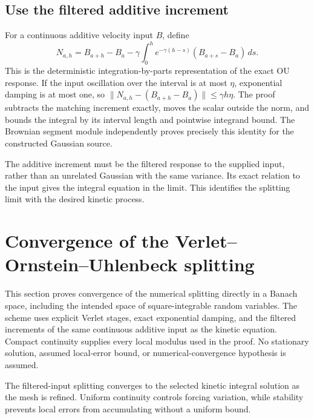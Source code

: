 \documentclass[11pt,a4paper]{report}
\begin{document}
\subsection{\texorpdfstring{Use the filtered additive increment}{Use the filtered additive increment}}
\label{report-step-KineticLangevin-KineticSplitting-lean-6}


For a continuous additive velocity input \(B\), define \[N_{a,h}=B_{a+h}-B_a-\gamma\int_0^h e^{-\gamma(h-s)}(B_{a+s}-B_a)\,ds.\] This is the deterministic integration-by-parts representation of the exact OU response. If the input oscillation over the interval is at most \(\eta\), exponential damping is at most one, so \(\|N_{a,h}-(B_{a+h}-B_a)\|\le\gamma h\eta\). The proof subtracts the matching increment exactly, moves the scalar outside the norm, and bounds the integral by its interval length and pointwise integrand bound. The Brownian segment module independently proves precisely this identity for the constructed Gaussian source.



The additive increment must be the filtered response to the supplied input, rather than an unrelated Gaussian with the same variance. Its exact relation to the input gives the integral equation in the limit. This identifies the splitting limit with the desired kinetic process.

\section{\texorpdfstring{Convergence of the Verlet–Ornstein–Uhlenbeck splitting}{Convergence of the Verlet–Ornstein–Uhlenbeck splitting}}
\label{proof-module-KineticLangevin-KineticSplittingConvergence-lean}


This section proves convergence of the numerical splitting directly in a Banach space, including the intended space of square-integrable random variables. The scheme uses explicit Verlet stages, exact exponential damping, and the filtered increments of the same continuous additive input as the kinetic equation. Compact continuity supplies every local modulus used in the proof. No stationary solution, assumed local-error bound, or numerical-convergence hypothesis is assumed.



The filtered-input splitting converges to the selected kinetic integral solution as the mesh is refined. Uniform continuity controls forcing variation, while stability prevents local errors from accumulating without a uniform bound.
\end{document}
